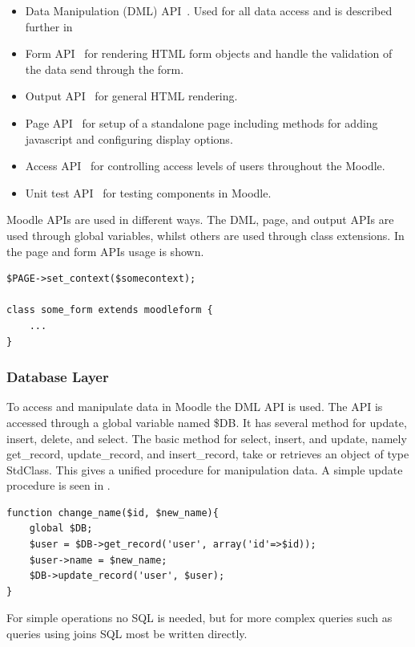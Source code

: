 \begin{itemize}
	\item Data Manipulation (DML) API~\cite{moodledml}. Used for all data access and is described further in 
	\item Form API~\cite{moodleformapi} for rendering HTML form objects and handle the validation of the data send through the form. 
	\item Output API~\cite{moodleoutputapi} for general HTML rendering.
	\item Page API~\cite{moodlepageapi} for setup of a standalone page including methods for adding javascript and configuring display options. 
	\item Access API~\cite{moodleaccessapi} for controlling access levels of users throughout the Moodle. 
	\item Unit test API~\cite{moodleunittestapi} for testing components in Moodle. 
\end{itemize}
Moodle APIs are used in different ways. The DML, page, and output APIs are used through global variables, whilst others are used through class extensions. In~ the page and form APIs usage is shown.
\begin{lstlisting}[style=phpCode, caption=\myCaption{Example of the Page and form APIs in Moodle}, label=moodleapiusage]
$PAGE->set_context($somecontext);

class some_form extends moodleform {
	...
}
\end{lstlisting}


\subsubsection{Database Layer}
\label{sec:moodleoplatformdbml}
To access and manipulate data in Moodle the DML API is used.  The API is accessed through a global variable named \$DB. It has several method for update, insert, delete, and select. 
The basic method for select, insert, and update, namely get\_record, update\_record, and insert\_record, take or retrieves an object of type StdClass. This gives a unified procedure for manipulation data. A simple update procedure is seen in .
\begin{lstlisting}[style=phpCode, caption=\myCaption{Example of how to change the name of an user}, label=moodlecodeupdate]
function change_name($id, $new_name){
	global $DB;
	$user = $DB->get_record('user', array('id'=>$id));
	$user->name = $new_name;
	$DB->update_record('user', $user);
}
\end{lstlisting}
For simple operations no SQL is needed, but for more complex queries such as queries using joins SQL most be written directly. 



